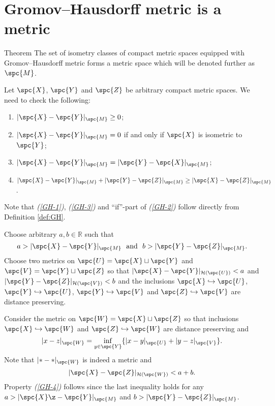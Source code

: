 \section{Gromov--Hausdorff metric is a metric}

\begin{thm}{Theorem}\label{thm:GH-is-a-metric}
The set of isometry classes of compact metric spaces equipped with Gromov--Hausdorff metric forms a metric space which will be denoted further as $\spc{M}$.
\end{thm}



Let $\spc{X}$, $\spc{Y}$ and $\spc{Z}$ be arbitrary  compact metric spaces.
We need to check the following:
\begin{enumerate}[{\it (i)}]
\item\label{GH-1} $|\spc{X}-\spc{Y}|_{\spc{M}}\ge 0$;
\item\label{GH-2} $|\spc{X}-\spc{Y}|_{\spc{M}}=0$ if and only if $\spc{X}$ is isometric to $\spc{Y}$;
\item\label{GH-3} $|\spc{X}-\spc{Y}|_{\spc{M}}=|\spc{Y}-\spc{X}|_{\spc{M}}$;
\item\label{GH-4} $|\spc{X}-\spc{Y}|_{\spc{M}}+|\spc{Y}-\spc{Z}|_{\spc{M}}\ge |\spc{X}-\spc{Z}|_{\spc{M}}$.
\end{enumerate}


Note that {\it (\ref{GH-1})}, {\it(\ref{GH-3})} and ``if''-part of {\it(\ref{GH-2})} follow directly from Definition \ref{def:GH}.

Choose arbitrary $a,b \in \mathbb{R}$ such that
$$a>|\spc{X}-\spc{Y}|_{\spc{M}}\ \ \text{and}\ \  b>|\spc{Y}-\spc{Z}|_{\spc{M}}.$$
Choose two metrics on $\spc{U}=\spc{X}\sqcup \spc{Y}$ and $\spc{V}=\spc{Y}\sqcup \spc{Z}$ so that
$|\spc{X}-\spc{Y}|_{\mathcal{H}(\spc{U})}<a$ and $|\spc{Y}-\spc{Z}|_{\mathcal{H}(\spc{V})}<b$ 
and the inclusions $\spc{X}\hookrightarrow \spc{U}$, $\spc{Y}\hookrightarrow \spc{U}$, $\spc{Y}\hookrightarrow \spc{V}$ and $\spc{Z}\hookrightarrow \spc{V}$ are distance preserving.

Consider the metric on $\spc{W}=\spc{X}\sqcup \spc{Z}$ 
so that inclusions $\spc{X}\hookrightarrow \spc{W}$ and $\spc{Z}\hookrightarrow \spc{W}$ are distance preserving
and 
$$|x-z|_{\spc{W}}=\inf_{y\in \spc{Y}}\{|x-y|_{\spc{U}}+|y-z|_{\spc{V}}\}.$$
Note that $|{*}-{*}|_{\spc{W}}$ is indeed a metric and 
$$|\spc{X}-\spc{Z}|_{\mathcal{H}(\spc{W})}<a+b.$$
Property {\it (\ref{GH-4})} follows since the last inequality holds for any $a>|\spc{X}\z-\spc{Y}|_{\spc{M}}$ and $b>|\spc{Y}-\spc{Z}|_{\spc{M}}$.
\qeds

